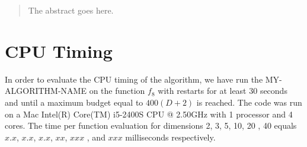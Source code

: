 \documentclass[conference]{IEEEtran}
\newcommand{\change}[1]{{\color{red} #1}}
\begin{document}
\maketitle



\begin{abstract}
The abstract goes here.
\end{abstract}





%
\IEEEpeerreviewmaketitle


%
%
%
\section{CPU Timing}
In order to evaluate the CPU timing of the algorithm, we have run the \change{MY-ALGORITHM-NAME} on the function $f_{8}$ with restarts for at least 30 seconds and until a maximum budget equal to \change{$400 (D + 2)$} is reached. The code was run on a \change{Mac Intel(R) Core(TM) i5-2400S CPU @ 2.50GHz} with \change{1} processor and \change{4} cores. The time per function evaluation for dimensions 2, 3, 5, 10, 20\change{, 40} equals \change{$x.x$}, \change{$x.x$}, \change{$x.x$}, \change{$xx$}, \change{$xxx$}\change{, and $xxx$} milliseconds respectively. 
\end{document}
